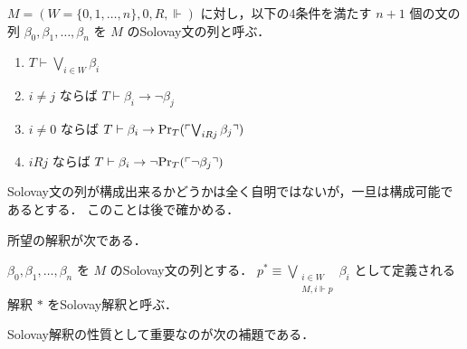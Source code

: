 \documentclass{jsarticle}
\begin{document}
\begin{definition}
	$M = (W = \{0,1,\dots,n\}, 0, R, \Vdash)$ に対し，以下の4条件を満たす $n + 1$ 個の文の列 $\beta_0, \beta_1, \dots, \beta_n$ を $M$ のSolovay文の列と呼ぶ．
	\begin{enumerate}
		\item $T \vdash \bigvee_{i \in W} \beta_i$
		\item $i \neq j$ ならば $T \vdash \beta_i \to \lnot \beta_j$
		\item $i \neq 0$ ならば $T \vdash \beta_i \to \mathrm{Pr}_T(\ulcorner \bigvee_{i R j} \beta_j \urcorner)$
		\item $i R j$ ならば $T \vdash \beta_i \to \lnot \mathrm{Pr}_T(\ulcorner \lnot \beta_j \urcorner)$
	\end{enumerate}
\end{definition}

\begin{remark}
	Solovay文の列が構成出来るかどうかは全く自明ではないが，一旦は構成可能であるとする．
	このことは後で確かめる．
\end{remark}

所望の解釈が次である．

\begin{definition}
	$\beta_0, \beta_1, \dots, \beta_n$ を $M$ のSolovay文の列とする．
	$p^* \equiv \bigvee_{\substack{i \in W \\ M, i \Vdash p}} \beta_i$ として定義される解釈 $*$ をSolovay解釈と呼ぶ．
\end{definition}

Solovay解釈の性質として重要なのが次の補題である．
\end{document}
